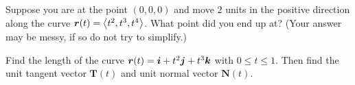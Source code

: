 \documentclass[12pt]{exam}
\begin{document}
\begin{questions}
\question Suppose you are at the point \((0,0,0)\) and move \(2\) units in the positive direction along the curve \(\bm{r}(t)=\left\langle t^2,t^3,t^4 \right\rangle\). What point did you end up at? (Your answer may be messy, if so do not try to simplify.)
\ifprintanswers
        \begin{solution}
%

            
        \end{solution}
    \else
        \vfill
    \fi    


    \question Find the length of the curve \(\bm{r}(t)=\bm{i}+t^2\bm{j}+t^3\bm{k}\) with \(0\le t\le 1\). Then find the unit tangent vector \(\bm{T}(t)\) and unit normal vector \(\bm{N}(t)\).
    

        \ifprintanswers
        \begin{solution}

        \end{solution}
    \else
        \vfill
    \fi     

\end{questions}
\end{document}
